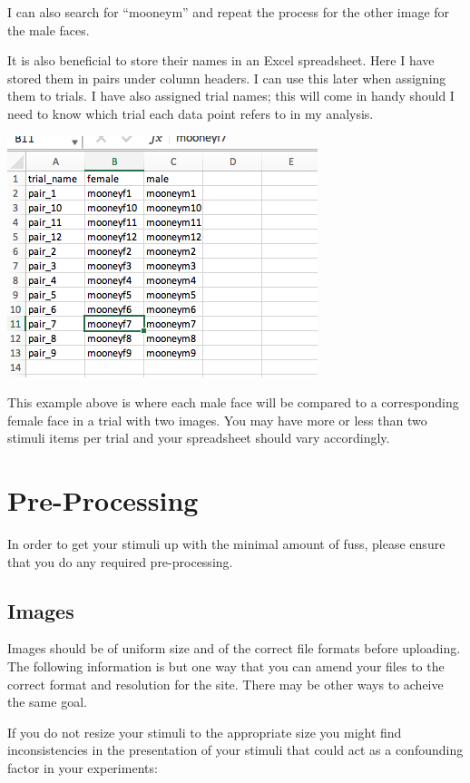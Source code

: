 \documentclass[]{book}
\begin{document}
I can also search for ``mooneym'' and repeat the process for the other
image for the male faces.

It is also beneficial to store their names in an Excel spreadsheet. Here
I have stored them in pairs under column headers. I can use this later
when assigning them to trials. I have also assigned trial names; this
will come in handy should I need to know which trial each data point
refers to in my analysis.

\includegraphics{images/screenshots/stim_2.png}

This example above is where each male face will be compared to a
corresponding female face in a trial with two images. You may have more
or less than two stimuli items per trial and your spreadsheet should
vary accordingly.

\section{Pre-Processing}\label{pre-processing}

In order to get your stimuli up with the minimal amount of fuss, please
ensure that you do any required pre-processing.

\subsection{Images}\label{images}

Images should be of uniform size and of the correct file formats before
uploading. The following information is but one way that you can amend
your files to the correct format and resolution for the site. There may
be other ways to acheive the same goal.

If you do not resize your stimuli to the appropriate size you might find
inconsistencies in the presentation of your stimuli that could act as a
confounding factor in your experiments:
\end{document}
